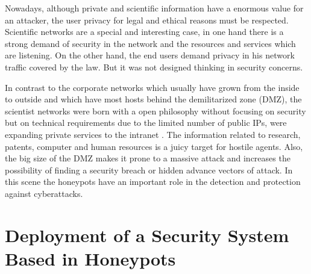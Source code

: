 \documentclass[a4paper]{llncs}
\begin{document}
	Nowadays, although private and scientific information have a enormous value for an attacker, the user privacy for legal and ethical reasons must be respected.
	Scientific networks are a special and interesting case, in one hand there is a strong demand of security in the network and the resources and services which are listening. On the other hand, the end users demand privacy in his network traffic covered by the law. But it was not designed thinking in security concerns\cite{iris-proyecto}.
	
	In contrast to the corporate networks which usually have grown from
	the inside to outside and which have most hosts behind the demilitarized
	zone (DMZ), the scientist networks were born with a open philosophy without focusing on security but on technical requirements due to the limited number of public IPs, were expanding private services to the intranet \cite{iris-proyecto}. The information related to research, patents, computer and human resources is a juicy target for hostile agents. Also, the big size of the DMZ makes it prone to a massive attack and increases the possibility of finding a security breach or hidden advance vectors of attack. In this scene the honeypots have an important role in the detection and protection against cyberattacks.
	
	
	\section{Deployment of a Security System Based in Honeypots}
\end{document}
